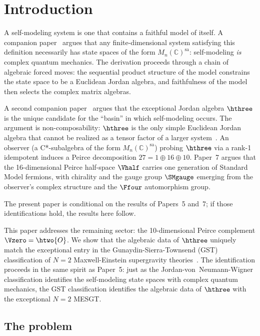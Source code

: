 
\section{Introduction}
\label{sec:intro}

A self-modeling system is one that contains a faithful model of itself.
A companion paper~\cite{Paper5} argues that any finite-dimensional
system satisfying this definition necessarily has state spaces of the
form $M_n(\mathbb{C})^{\mathrm{sa}}$: self-modeling \emph{is} complex
quantum mechanics. The derivation proceeds through a chain of algebraic
forced moves: the sequential product structure of the model constrains
the state space to be a Euclidean Jordan algebra, and faithfulness of
the model then selects the complex matrix algebras.

A second companion paper~\cite{Paper7} argues that the exceptional Jordan
algebra $\hthree$ is the unique candidate for the ``basin'' in which
self-modeling occurs. The argument is non-composability: $\hthree$ is
the only simple Euclidean Jordan algebra that cannot be realized as a
tensor factor of a larger system~\cite{BarnumGraydonWilce2020}. An
observer (a C*-subalgebra of the form $M_n(\mathbb{C})^{\mathrm{sa}}$)
probing $\hthree$ via a rank-1 idempotent induces a Peirce decomposition
$27 = 1 \oplus 16 \oplus 10$. Paper~7 argues that the 16-dimensional
Peirce half-space $\Vhalf$ carries one generation of Standard Model
fermions, with chirality and the gauge group $\SMgauge$ emerging from
the observer's complex structure and the $\Ffour$ automorphism group.

The present paper is conditional on the results of Papers~5 and~7;
if those identifications hold, the results here follow.

This paper addresses the remaining sector: the 10-dimensional Peirce
complement $\Vzero = \htwo{O}$. We show that the algebraic data of
$\hthree$ uniquely match the exceptional entry in the
Gunaydin-Sierra-Townsend (GST) classification of $N{=}2$
Maxwell-Einstein supergravity theories~\cite{GST1983,GST1984}. The
identification proceeds in the same spirit as Paper~5: just as
the Jordan-von~Neumann-Wigner classification identifies the
self-modeling state spaces with complex quantum mechanics, the GST
classification identifies the algebraic data of $\hthree$ with the
exceptional $N{=}2$ MESGT.

\subsection{The problem}

